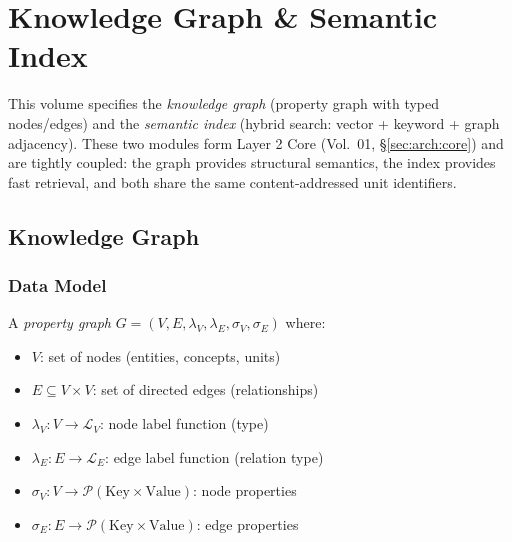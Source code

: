 \chapter{Knowledge Graph \& Semantic Index}
\label{cha:knowledge-graph}

This volume specifies the \emph{knowledge graph} (property graph with typed nodes/edges) and the \emph{semantic index} (hybrid search: vector + keyword + graph adjacency). These two modules form Layer 2 Core (Vol.~01, \S\ref{sec:arch:core}) and are tightly coupled: the graph provides structural semantics, the index provides fast retrieval, and both share the same content-addressed unit identifiers.

\section{Knowledge Graph}
\label{sec:kg:graph}

\subsection{Data Model}
\label{sec:kg:data-model}

\begin{definition}
\label{def:property-graph}
A \emph{property graph} $G = (V, E, \lambda_V, \lambda_E, \sigma_V, \sigma_E)$ where:
\begin{itemize}
  \item $V$: set of nodes (entities, concepts, units)
  \item $E \subseteq V \times V$: set of directed edges (relationships)
  \item $\lambda_V: V \to \mathcal{L}_V$: node label function (type)
  \item $\lambda_E: E \to \mathcal{L}_E$: edge label function (relation type)
  \item $\sigma_V: V \to \mathcal{P}(\text{Key} \times \text{Value})$: node properties
  \item $\sigma_E: E \to \mathcal{P}(\text{Key} \times \text{Value})$: edge properties
\end{itemize}
\end{definition}

